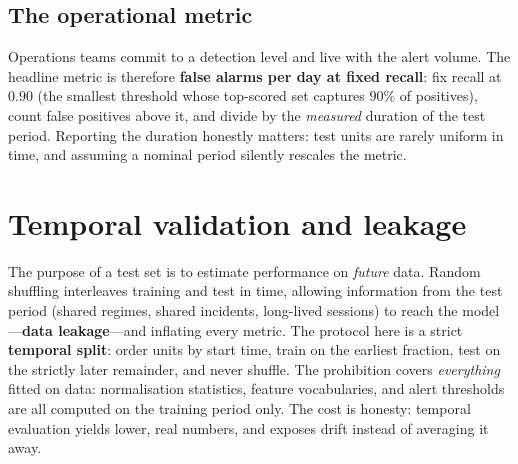 \documentclass[11pt,a4paper]{report}
\newcommand{\keyword}[1]{\textbf{\color{accent2}#1}}
\begin{document}
\subsection{The operational metric}
Operations teams commit to a detection level and live with the alert
volume. The headline metric is therefore \keyword{false alarms per day at
fixed recall}: fix recall at $0.90$ (the smallest threshold whose top-scored
set captures $90\%$ of positives), count false positives above it, and
divide by the \emph{measured} duration of the test period. Reporting the
duration honestly matters: test units are rarely uniform in time, and
assuming a nominal period silently rescales the metric.

\section{Temporal validation and leakage}
\label{sec:theory-temporal}
The purpose of a test set is to estimate performance on \emph{future} data.
Random shuffling interleaves training and test in time, allowing
information from the test period (shared regimes, shared incidents,
long-lived sessions) to reach the model---\keyword{data leakage}---and
inflating every metric. The protocol here is a strict \keyword{temporal
split}: order units by start time, train on the earliest fraction, test on
the strictly later remainder, and never shuffle. The prohibition covers
\emph{everything} fitted on data: normalisation statistics, feature
vocabularies, and alert thresholds are all computed on the training period
only. The cost is honesty: temporal evaluation yields lower, real numbers,
and exposes drift instead of averaging it away.
\end{document}
